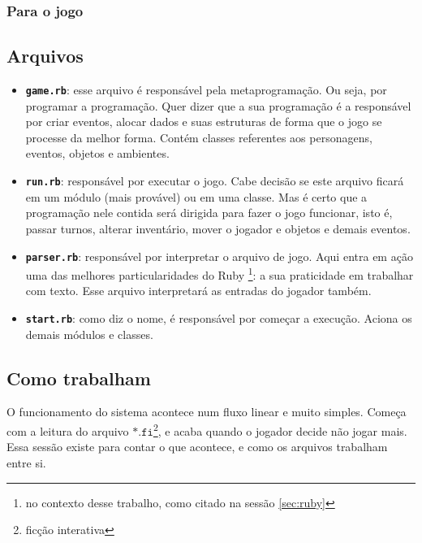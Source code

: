









\subsubsection{Para o jogo}
\label{subsubsec:game}

\subsection{Arquivos}
\label{subsec:files}

\begin{itemize}
  \item \texttt{\textbf{game.rb}}: esse arquivo é responsável pela
  metaprogramação. Ou seja, por programar a programação. Quer dizer que a sua
  programação é a responsável por criar eventos, alocar dados e suas estruturas
  de forma que o jogo se processe da melhor forma. Contém classes referentes aos
  personagens, eventos, objetos e ambientes.
  \item \texttt{\textbf{run.rb}}: responsável por executar o jogo. Cabe decisão
  se este arquivo ficará em um módulo (mais provável) ou em uma classe. Mas é
  certo que a programação nele contida será dirigida para fazer o jogo funcionar,
  isto é, passar turnos, alterar inventário, mover o jogador e objetos e demais
  eventos.
  \item \texttt{\textbf{parser.rb}}: responsável por interpretar o arquivo de
  jogo. Aqui entra em ação uma das melhores particularidades do Ruby
  \footnote{no contexto desse trabalho, como citado na sessão \ref{sec:ruby}}: a
  sua praticidade em trabalhar com texto. Esse arquivo interpretará as entradas
  do jogador também.
  \item \texttt{\textbf{start.rb}}: como diz o nome, é responsável por começar a
  execução. Aciona os demais módulos e classes.
\end{itemize}

\subsection{Como trabalham}
\label{subsec:how-they-work}

O funcionamento do sistema acontece num fluxo linear e muito simples. Começa com
a leitura do arquivo $\mathtt{*.fi}$\footnote{ficção interativa}, e acaba quando
o jogador decide não jogar mais. Essa sessão existe para contar o que acontece,
e como os arquivos trabalham entre si.

